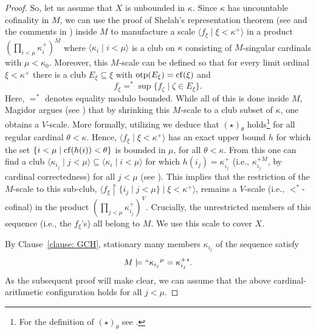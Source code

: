 \documentclass[11pt]{amsart}
\theoremstyle{definition}
\theoremstyle{remark}
\newcommand{\cf}{{\rm cf}}
\def\s{\subseteq}
\newcommand\tom[1]{\marginpar{Tom: #1}}
\begin{document}
\begin{proof}
    So, let us assume that $X$ is unbounded in $\kappa$.  Since $\kappa$ has uncountable cofinality in $M$, we can use the proof of Shelah's representation theorem (see \cite[Theorem~2.23]{AbrahamMagidor} and the comments in \cite[Theorem~2.33]{AbrahamMagidor}) inside  $M$ to  manufacture a scale $\langle f_\xi \mid \xi <\kappa^+\rangle$ %
    in a product $(\prod_{i<\mu}\kappa_i^+)^M$ where $\langle \kappa_i\mid i<\mu\rangle$ is a club on $\kappa$ consisting of $M$-singular cardinals with $\mu<\kappa_0$. Moreover, this $M$-scale can be defined so that for every limit ordinal $\xi < \kappa^+$ there is a club $E_\xi  \s\xi$ with $\mathrm{otp}(E_\xi)=\cf(\xi)$ and 
    $$f_\xi=^*\sup\{f_\zeta\mid \zeta\in E_\xi\}.$$
Here, $=^*$ denotes equality modulo bounded.
    While all of this is done inside $M$, Magidor argues (see \cite[Theorem~2.23]{AbrahamMagidor}) that by shrinking this $M$-scale to a club subset of $\kappa$, one obtains a $V$-scale. More formally, utilizing  \cite[Lemma~2.19]{AbrahamMagidor} we deduce that $(\star)_\theta$ holds\footnote{For the definition of $(\star)_\theta$ see \cite[Definition~2.8]{AbrahamMagidor}.} for all regular cardinal $\theta < \kappa$.  Hence,   $\langle f_\xi\mid \xi < \kappa^+\rangle$ has an exact upper bound $h$ for which the set $\{i<\mu\mid \cf(h(i))<\theta\}$ is   bounded in $\mu$, for all $\theta < \kappa$. From this one can find a club $\langle \kappa_{i_j}\mid j<\mu\rangle \s \langle \kappa_i\mid i<\mu\rangle$ for which $h(i_j)=\kappa_{i_j}^+$ (i.e., $\kappa_{i_j}^{+M}$, by cardinal correctedness) for all $j<\mu$ (see \cite[Claim~2.24]{AbrahamMagidor}). This implies that the restriction of the $M$-scale to this sub-club,   $\langle f_\xi \restriction \{i_j\mid j<\mu\}\mid \xi < \kappa^+\rangle$,  remains  a $V$-scale (i.e., $<^*$-cofinal) in the product   $(\prod_{j<\mu} \kappa_{i_j}^+)^V$. Crucially, the unrestricted members of this sequence (i.e., the $f_\xi$'s) all belong to $M$.
We use this scale to cover $X$.
    \smallskip
    
    
    By Clause~\eqref{clause: GCH},  stationary many members $\kappa_{i_j}$ of the sequence satisfy $$\text{$M\models ``{\kappa_{i_j}}^\mu=\kappa_{i_j}^+$".}$$ %
    As the subsequent proof will make clear, we can assume   that the above cardinal-arithmetic configuration holds for all $j<\mu$.


\end{proof}
\end{document}

